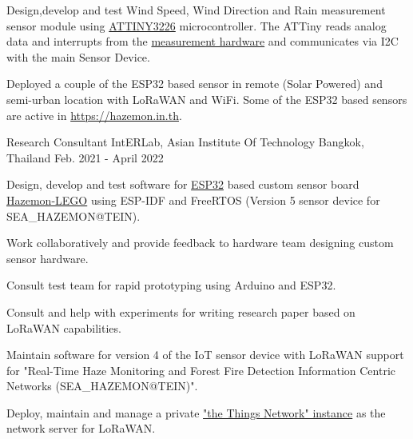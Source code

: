 \begin{cventries}
{\begin{cvitems}
    		\item {Design,develop and test Wind Speed, Wind Direction and Rain measurement sensor module using \href{https://www.microchip.com/en-us/product/ATTINY3226}{ATTINY3226} microcontroller. The ATTiny reads analog data and interrupts from the \href{https://www.dfrobot.com/product-1308.html}{measurement hardware} and communicates via I2C with the main Sensor Device.}
    		\item {Deployed a couple of the ESP32 based sensor in remote (Solar Powered) and semi-urban location with LoRaWAN and WiFi. Some of the ESP32 based sensors are active in \url{https://hazemon.in.th}.}
  \end{cvitems}}

  \cventry
  {Research Consultant} %
  {IntERLab, Asian Institute Of Technology} %
  {Bangkok, Thailand} %
  {Feb. 2021 - April 2022} %
  {\begin{cvitems} %
  		\item {Design, develop and test software for \href{https://www.espressif.com/en/products/socs/esp32}{ESP32} based custom sensor board \href{https://lora.hazemon.in.th/can5/firmware/Hazemon-LEGO-Brochure.pdf}{Hazemon-LEGO} using ESP-IDF and FreeRTOS (Version 5 sensor device for SEA\_HAZEMON@TEIN).}
  		\item {Work collaboratively and provide feedback to hardware team designing custom sensor hardware.}
  		\item {Consult test team for rapid prototyping using Arduino and ESP32.}
  		\item {Consult and help with experiments for writing research paper based on LoRaWAN capabilities.}
  		\item {Maintain software for version 4 of the IoT sensor device with LoRaWAN support for "Real-Time Haze Monitoring and Forest Fire Detection Information Centric Networks (SEA\_HAZEMON@TEIN)".}
  		\item {Deploy, maintain and manage a private \href{https://ttn.hazemon.in.th/}{"the Things Network" instance} as the network server for LoRaWAN.}
  \end{cvitems}}
  

\end{cventries}
